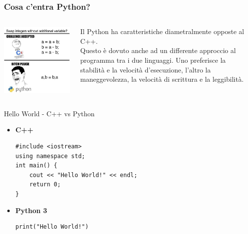 \documentclass[11pt]{beamer}
\begin{document}
\begin{frame}
\frametitle{Cosa c'entra Python?}
\begin{columns}[T] %
	\begin{column}{.48\textwidth}
		\includegraphics[width=\linewidth]{C_Python.JPG}
	\end{column}%
	\hfill%
	\begin{column}{.48\textwidth}
		Il Python ha caratteristiche diametralmente opposte al C++.\\
		Questo è dovuto anche ad un differente approccio al programma tra i due linguaggi. Uno preferisce la stabilità e la velocità d'esecuzione, l'altro la maneggevolezza, la velocità di scrittura e la leggibilità.
	\end{column}%
\end{columns}
\end{frame}

\begin{frame}[fragile]{Hello World - C++ vs Python}
\begin{itemize}
	\pause
	\item \textbf{C++}\\
	\begin{verbatim}
#include <iostream>
using namespace std;
int main() {
    cout << "Hello World!" << endl;
    return 0;
}
	\end{verbatim}
	\pause
	\item \textbf{Python 3} \\
	\begin{verbatim}
print("Hello World!")
	\end{verbatim}
\end{itemize}
\end{frame}
\end{document}
